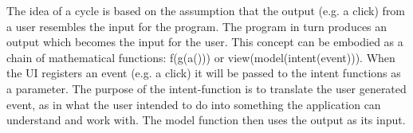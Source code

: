 The idea of a cycle is based on the assumption that the output (e.g. a click) from a user resembles the input for the program. The program in turn produces an output 
which becomes the input for the user. This concept can be embodied as a chain of mathematical functions: f(g(a())) or view(model(intent(event))).
When the UI registers an event (e.g. a click) it will be passed to the intent functions as a parameter. The purpose of the intent-function is 
to translate the user generated event, as in what the user intended to do into something the application can understand and work with. 
The model function then uses the output as its input. 




